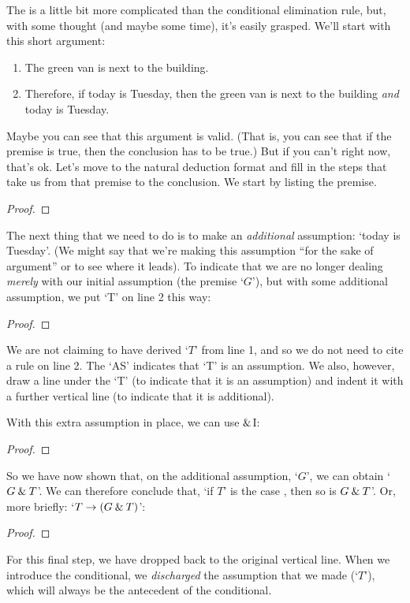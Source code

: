 The  is a little bit more complicated than the conditional elimination rule, but, with some thought (and maybe some time), it's easily grasped. We'll start with this short argument:
	\begin{enumerate}
\itemsep-1mm
\item	The green van is next to the building.
\item	Therefore, if today is Tuesday, then the green van is next to the building \emph{and} today is Tuesday.
	\end{enumerate}
Maybe you can see that this argument is valid. (That is, you can see that if the premise is true, then the conclusion has to be true.) But if you can't right now, that's ok. Let's move to the natural deduction format and fill in the steps that take us from that premise to the conclusion. We start by listing the premise.
	\begin{proof}
		 
	\end{proof}
The next thing that we need to do is to make an \emph{additional} assumption: `today is Tuesday'. (We might say that we're making this assumption ``for the sake of argument'' or to see where it leads). To indicate that we are no longer dealing \emph{merely} with our initial assumption (the premise `$G$'), but with some additional assumption, we put `T' on line 2 this way:
	\begin{proof}
		 
		\open
			 
	\end{proof}
We are not claiming to have derived `$T$' from line 1, and so we do not need to cite a rule on line 2. The `AS' indicates that `T' is an assumption. We also, however, draw a line under the `T' (to indicate that it is an assumption) and indent it with a further vertical line (to indicate that it is additional). 

With this extra assumption in place, we can use $\mathbin{\&}$I:
	\begin{proof}
		 
		\open
			 
	\end{proof}
So we have now shown that, on the additional assumption, `$G$', we can obtain `$G \mathbin{\&} T$'. We can therefore conclude that, `if $T$' is the case , then so is $G \mathbin{\&} T$'. Or, more briefly: `$T \rightarrow (G \mathbin{\&} T)$':
	\begin{proof}
		 
		\open
			 
			\close
	\end{proof}
For this final step, we have dropped back to the original vertical line. When we introduce the conditional, we \emph{discharged} the assumption that we made (`$T$'), which will always be the antecedent of the conditional.  

